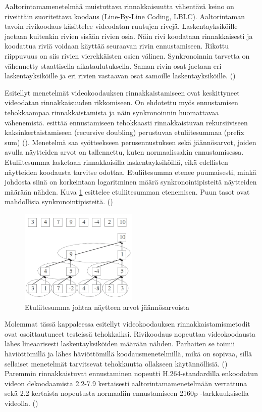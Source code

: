 Aaltorintamamenetelmää muistuttava rinnakkaisuutta vähentävä keino on riveittäin
suoritettava koodaus (Line-By-Line Coding, LBLC). Aaltorintaman tavoin
rivikoodaus käsittelee videodatan ruutujen rivejä. Laskentayksiköille jaetaan
kuitenkin rivien sisään rivien osia. Näin rivi koodataan rinnakkaisesti ja
koodattua riviä voidaan käyttää seuraavan rivin ennustamiseen. Rikottu
riippuvuus on siis rivien vierekkäisten osien välinen. Synkronoinnin tarvetta
on vähennetty staattisella aikataulutuksella. Saman rivin osat jaetaan eri
laskentayksiköille ja eri rivien vastaavan osat samoille laskentayksiköille.
(\citealt{xu})

Esitellyt menetelmät videokoodauksen rinnakkaistamiseen ovat keskittyneet
videodatan rinnakkaisuuden rikkomiseen. On ehdotettu myös ennustamisen
tehokkaampaa rinnakkaistamista ja näin synkronoinnin huomattavaa vähenemistä.
\citealt{pieters} esittää ennustamiseen tehokkaasti rinnakkaistuvan
rekursiiviseen kaksinkertaistamiseen (recursive doubling) perustuvaa
etuliitesummaa (prefix sum) (\citealt{blelloch}). Menetelmä saa syötteekseen
perusennustuksen sekä jäännösarvot, joiden avulla näytteiden arvot on
tallennettu, kuten normaalissakin ennustamisessa. Etuliitesumma lasketaan
rinnakkaisilla laskentayksiköillä, eikä edellisten näytteiden koodausta
tarvitse odottaa. Etuliitesumma etenee puumaisesti, minkä johdosta siinä on
korkeintaan logaritminen määrä synkronointipisteitä näytteiden määrään nähden.
Kuva \ref{fig:prefix_sum} esittelee etuliitesumman etenemisen. Puun tasot ovat
mahdollisia synkronointipisteitä. (\citealt{pieters})

\begin{figure}[ht]
	\centering
	\includegraphics[width=0.5\textwidth]{prefix_sum.jpg}
	\caption{Etuliitesumma johtaa näytteen arvot jäännösarvoista}
	\label{fig:prefix_sum}
\end{figure}

Molemmat tässä kappaleessa esitellyt videokoodauksen rinnakkaistamismetodit
ovat osoittautuneet testeissä tehokkaiksi. Rivikoodaus nopeuttaa videokoodausta
lähes lineaarisesti laskentayksiköiden määrään nähden. Parhaiten se toimii
häviöttömillä ja lähes häviöttömillä koodausmenetelmillä, mikä on sopivaa,
sillä sellaiset menetelmät tarvitsevat tehokkuutta ollakseen käytännöllisiä.
(\citealt{xu}) Paremmin rinnakkaistuvat ennustaminen nopeutti H.264-standardilla
enkoodatun videon dekoodaamista 2.2-7.9 kertaisesti aaltorintamamenetelmään
verrattuna sekä 2.2 kertaista nopeutusta normaaliin ennustamiseen 2160p
-tarkkuuksisella videolla. (\citealt{pieters})

